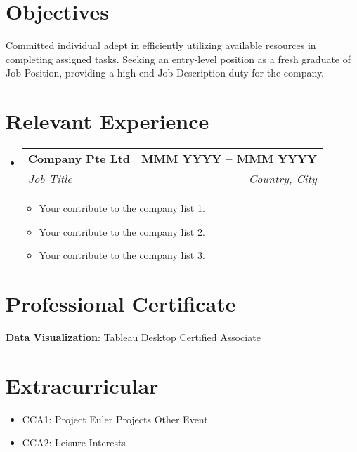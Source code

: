 \documentclass[letterpaper,11pt]{article}
\makeatletter
\newcommand{\resumeItem}[1]{
  \item\small{
    {#1 \vspace{-2pt}}
  }
}
\newcommand{\resumeSubheading}[4]{
  \vspace{-2pt}\item
    \begin{tabular*}{1.0\textwidth}[t]{l@{\extracolsep{\fill}}r}
      \textbf{#1} & \textbf{\small #2} \\
      \textit{\small#3} & \textit{\small #4} \\
    \end{tabular*}\vspace{-7pt}
}
\newcommand{\resumeSubHeadingListStart}{\begin{itemize}[leftmargin=0.0in, label={}]}
\newcommand{\resumeSubHeadingListEnd}{\end{itemize}}
\newcommand{\resumeItemListStart}{\begin{itemize}}
\newcommand{\resumeItemListEnd}{\end{itemize}\vspace{-5pt}}
\makeatother
\begin{document}
\section{Objectives}
Committed individual adept in efficiently utilizing available resources in completing assigned tasks. Seeking an entry-level position as a fresh graduate of Job Position, providing a high end Job Description duty for the company.


\section{Relevant Experience}
  \resumeSubHeadingListStart

    \resumeSubheading
      {Company Pte Ltd}{MMM YYYY -- MMM YYYY}
      {Job Title}{Country, City}
      \resumeItemListStart
        \resumeItem{Your contribute to the company list 1.}
        \resumeItem{Your contribute to the company list 2.}
        \resumeItem{Your contribute to the company list 3.}

      \resumeItemListEnd


  \resumeSubHeadingListEnd
\vspace{-8pt}


\section{Professional Certificate}
 \begin{itemize}[leftmargin=0.15in, label={}]
    \small{\item{
     \textbf{Data Visualization}{: Tableau Desktop Certified Associate} \\
    
    }}
 \end{itemize}
 \vspace{-8pt}


\section{Extracurricular}
\begin{itemize}
\item{CCA1: \newline Project Euler \newline
Projects\newline 		
Other Event\newline
}
\item{CCA2: \newline 
Leisure Interests\newline}
\end{itemize}
\end{document}

